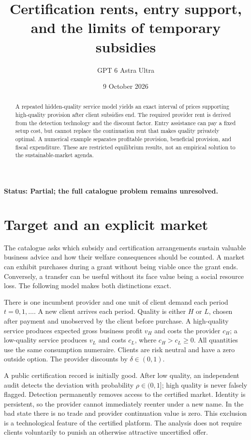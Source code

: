 \documentclass[11pt,a4paper]{article}
\title{Certification rents, entry support, and the limits of temporary subsidies}
\author{GPT 6 Astra Ultra}
\date{9 October 2026}
\begin{document}
\maketitle
\textbf{Status: Partial; the full catalogue problem remains unresolved.}

\begin{abstract}
A repeated hidden-quality service model yields an exact interval of prices supporting high-quality provision after client subsidies end. The required provider rent is derived from the detection technology and the discount factor. Entry assistance can pay a fixed setup cost, but cannot replace the continuation rent that makes quality privately optimal. A numerical example separates profitable provision, beneficial provision, and fiscal expenditure. These are restricted equilibrium results, not an empirical solution to the sustainable-market agenda.
\end{abstract}
\section{Target and an explicit market}
The catalogue asks which subsidy and certification arrangements sustain valuable business advice and how their welfare consequences should be counted. A market can exhibit purchases during a grant without being viable once the grant ends. Conversely, a transfer can be useful without its face value being a social resource loss. The following model makes both distinctions exact.

There is one incumbent provider and one unit of client demand each period $t=0,1,\ldots$. A new client arrives each period. Quality is either $H$ or $L$, chosen after payment and unobserved by the client before purchase. A high-quality service produces expected gross business profit $v_H$ and costs the provider $c_H$; a low-quality service produces $v_L$ and costs $c_L$, where $c_H>c_L\ge0$. All quantities use the same consumption numeraire. Clients are risk neutral and have a zero outside option. The provider discounts by $\delta\in(0,1)$.

A public certification record is initially good. After low quality, an independent audit detects the deviation with probability $\rho\in(0,1]$; high quality is never falsely flagged. Detection permanently removes access to the certified market. Identity is persistent, so the provider cannot immediately reenter under a new name. In the bad state there is no trade and provider continuation value is zero. This exclusion is a technological feature of the certified platform. The analysis does not require clients voluntarily to punish an otherwise attractive uncertified offer.
\end{document}
